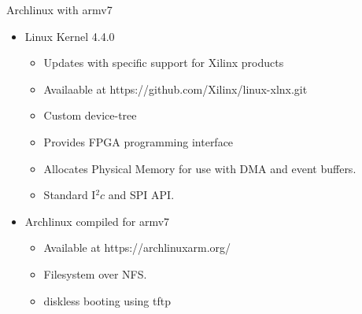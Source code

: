 
Archlinux with armv7

\begin{itemize}
\item Linux Kernel 4.4.0
  \begin{itemize}
  \item Updates with specific support for Xilinx products
  \item Availaable at https://github.com/Xilinx/linux-xlnx.git
  \item Custom device-tree
  \item Provides FPGA programming interface
  \item Allocates Physical Memory for use with DMA and event buffers.
  \item Standard I$^2c$ and SPI API.
  \end{itemize}

\item Archlinux compiled for armv7
  \begin{itemize}
  \item Available at https://archlinuxarm.org/
  \item Filesystem over NFS.
  \item diskless booting using tftp
  \end{itemize}

\end{itemize}
